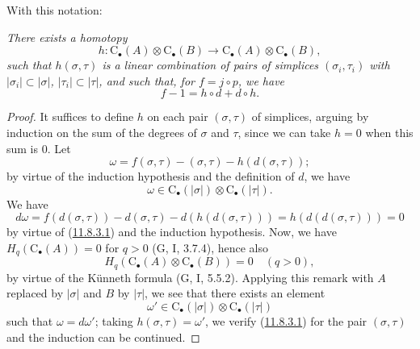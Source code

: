 With this notation:
\begin{proposition}[11.8.3]
\label{0.11.8.3}
\emph{There exists a homotopy
\[
h:\mathrm C_\bullet(A)\otimes\mathrm C_\bullet(B)
\longrightarrow\mathrm C_\bullet(A)\otimes\mathrm C_\bullet(B),
\]
such that $h(\sigma,\tau)$ is a linear combination of pairs of simplices
$(\sigma_i,\tau_i)$ with $|\sigma_i|\subset|\sigma|$,
$|\tau_i|\subset|\tau|$, and such that, for $f=j\circ p$, we have}
\[
\label{0.11.8.3.1}
\tag{11.8.3.1}
f-1=h\circ d+d\circ h.
\]
\end{proposition}

\begin{proof}
It suffices to define $h$ on each pair $(\sigma,\tau)$ of simplices,
arguing by induction on the sum of the degrees of $\sigma$ and $\tau$, since
we can take $h=0$ when this sum is $0$. Let
\[
\omega=f(\sigma,\tau)-(\sigma,\tau)-h(d(\sigma,\tau));
\]
by virtue of the induction hypothesis and the definition of $d$, we have
\[
\omega\in\mathrm C_\bullet(|\sigma|)\otimes\mathrm C_\bullet(|\tau|).
\]
We have
\[
d\omega=f(d(\sigma,\tau))-d(\sigma,\tau)-d(h(d(\sigma,\tau)))
=h(d(d(\sigma,\tau)))=0
\]
by virtue of (\hyperref[0.11.8.3.1]{11.8.3.1}) and the induction
hypothesis. Now, we have
$H_q(\mathrm C_\bullet(A))=0$ for $q>0$ (G, I, 3.7.4), hence also
\[
H_q(\mathrm C_\bullet(A)\otimes\mathrm C_\bullet(B))=0\quad(q>0),
\]
by virtue of the Künneth formula (G, I, 5.5.2). Applying this remark with
$A$ replaced by $|\sigma|$ and $B$ by $|\tau|$, we see that there exists an
element
\[
\omega'\in\mathrm C_\bullet(|\sigma|)\otimes\mathrm C_\bullet(|\tau|)
\]
such that $\omega=d\omega'$; taking $h(\sigma,\tau)=\omega'$, we verify
(\hyperref[0.11.8.3.1]{11.8.3.1}) for the pair $(\sigma,\tau)$ and the
induction can be continued.
\end{proof}

